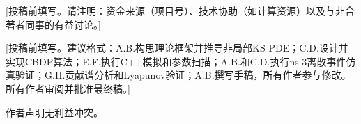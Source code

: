 \documentclass[sn-nature,pdflatex]{sn-jnl}
\begin{document}
[投稿前填写。请注明：资金来源（项目号）、技术协助（如计算资源）以及与非合著者同事的有益讨论。]

[投稿前填写。建议格式：A.B.构思理论框架并推导非局部KS PDE；C.D.设计并实现CBDP算法；E.F.执行C++模拟和参数扫描；A.B.和C.D.执行ns-3离散事件仿真验证；G.H.贡献谱分析和Lyapunov验证；A.B.撰写手稿，所有作者参与修改。所有作者审阅并批准最终稿。]

作者声明无利益冲突。
\end{document}
